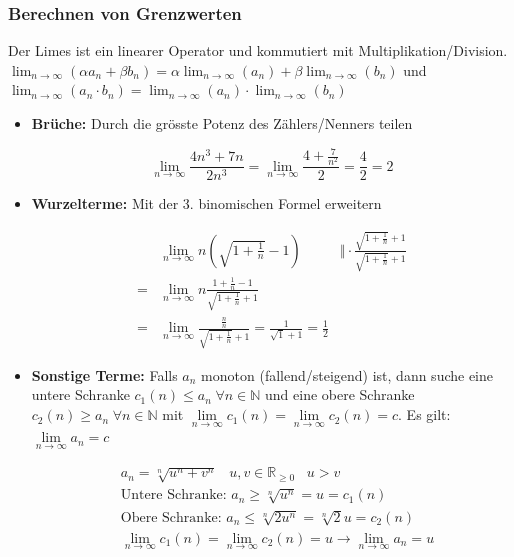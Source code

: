 \documentclass[8pt, a4paper, landscape, fleqn]{scrartcl}
\newenvironment {example}
				{\begin{itshape} \begin{small}}
				{\end{small} \end{itshape}}
\begin{document}
\begin{multicols*}{3}
				\subsubsection{Berechnen von Grenzwerten}
				Der Limes ist ein linearer Operator und kommutiert mit Multiplikation/Division. $\lim_{n\to\infty} (\alpha a_n + \beta b_n) = \alpha \lim_{n\to\infty} (a_n) + \beta \lim_{n\to\infty} (b_n)$ und $\lim_{n\to\infty} (a_n \cdot b_n) = \lim_{n\to\infty} (a_n) \cdot \lim_{n\to\infty} (b_n)$
				\label{subsubsection:limitcalc}
					\begin{itemize}
						\item \textbf{Brüche:} Durch die grösste Potenz des Zählers/Nenners teilen
						\begin{example}
							\begin{equation*}
							\lim_{n\rightarrow \infty} \frac{4n^3+7n}{2n^3}=\lim_{n\rightarrow \infty} \frac{4+\frac{7}{n^2}}{2}=\frac{4}{2}=2
							\end{equation*}
						\end{example}						
						\item  \textbf{Wurzelterme:} Mit der 3. binomischen Formel erweitern
						\begin{example}
							\begin{align*}
							&\lim_{n\rightarrow \infty} n \left(\sqrt{1+\frac{1}{n}}-1\right) &\Vert \cdot \frac{\sqrt{1+\frac{1}{n}}+1}{\sqrt{1+\frac{1}{n}}+1}\\
							=&\lim_{n\rightarrow \infty} n\frac{1+\frac{1}{n}-1}{\sqrt{1+\frac{1}{n}}+1}\\
							=&\lim_{n\rightarrow \infty} \frac{\frac{n}{n}}{\sqrt{1+\frac{1}{n}}+1}=\frac{1}{\sqrt{1}+1}=\frac{1}{2}
							\end{align*}
						\end{example}						
						\item \textbf{Sonstige Terme:} Falls $a_n$ monoton (fallend/steigend) ist, dann suche eine untere Schranke $c_1(n) \le a_n \hspace{3pt} \forall n \in \mathbb{N}$ und eine obere Schranke $c_2(n) \ge a_n \hspace{3pt} \forall n \in \mathbb{N}$ mit $\lim\limits_{n \rightarrow \infty} c_1(n)=\lim\limits_{n \rightarrow \infty} c_2(n)=c$. Es gilt:
						$\lim\limits_{n \rightarrow \infty} a_n=c$
						\begin{example}
							\begin{align*}
								&a_n=\sqrt[n]{u^n+v^n} \hspace{10pt} u, v \in \mathbb{R}_{\ge 0} \hspace{10pt} u>v\\
								&\text{Untere Schranke: } a_n \ge \sqrt[n]{u^n}=u=c_1(n)\\
								&\text{Obere Schranke: } a_n \le \sqrt[n]{2u^n}=\sqrt[n]{2}u=c_2(n)\\
								&\lim_{n\rightarrow \infty}c_1(n)=\lim_{n\rightarrow \infty}c_2(n)=u \rightarrow \lim_{n\rightarrow \infty} a_n=u
							\end{align*}
						\end{example}					
					\end{itemize}

\end{multicols*}
\end{document}
